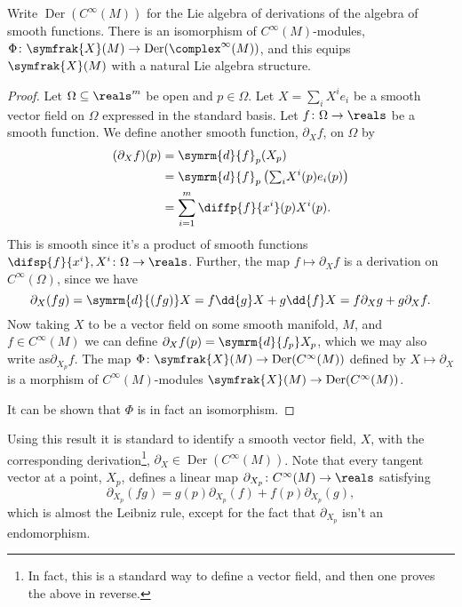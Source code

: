 \documentclass[fleqn]{NotesClass}
\renewcommand{\dl}{\symrm{d}}
\newcommand{\vectorFields}{\symfrak{X}}
\DeclareMathOperator{\Der}{Der}
\newcommand{\derivations}{\Der}
\begin{document}
    \begin{thm}{}{}
        Write \(\derivations(C^{\infty}(M))\) for the Lie algebra of derivations of the algebra of smooth functions. There is an isomorphism of \(C^{\infty}(M)\)-modules, \(\Phi \colon \vectorFields(M) \to \derivations(\complex^{\infty}(M))\), and this equips \(\vectorFields(M)\) with a natural Lie algebra structure.
        \begin{proof}
            Let \(\Omega \subseteq \reals^m\) be open and \(p \in \Omega\).
            Let \(X = \sum_i X^i e_i\) be a smooth vector field on \(\Omega\) expressed in the standard basis.
            Let \(f \colon \Omega \to \reals\) be a smooth function.
            We define another smooth function, \(\partial_Xf\), on \(\Omega\) by
            \begin{align}
                (\partial_X f)(p) &= \dl{f}_p(X_p)\\
                &= \dl{f}_p\left( {\textstyle\sum_i} X^i(p)e_i(p) \right)\\
                &= \sum_{i=1}^m \diffp{f}{x^i}(p) X^i(p).
            \end{align}
            This is smooth since it's a product of smooth functions \(\difsp{f}{x^i}, X^i \colon \Omega \to \reals\).
            Further, the map \(f \mapsto \partial_X f\) is a derivation on \(C^{\infty}(\Omega)\), since we have
            \begin{equation}
                \partial_X(fg) = \dl{(fg)}X = f \dd{g}X + g \dd{f}X = f\partial_Xg + g\partial_Xf.
            \end{equation}
            Now taking \(X\) to be a vector field on some smooth manifold, \(M\), and \(f \in C^{\infty}(M)\) we can define \(\partial_Xf(p) = \dl{f_p}X_p\), which we may also write as\(\partial_{X_p}f\).
            The map \(\Phi \colon \vectorFields(M) \to \derivations(C^{\infty}(M))\) defined by \(X \mapsto \partial_X\) is a morphism of \(C^{\infty}(M)\)-modules \(\vectorFields(M) \to \derivations(C^{\infty}(M))\).
            
            It can be shown that \(\Phi\) is in fact an isomorphism.
        \end{proof}
    \end{thm}
    
    Using this result it is standard to identify a smooth vector field, \(X\), with the corresponding derivation\footnote{In fact, this is a standard way to define a vector field, and then one proves the above in reverse.}, \(\partial_X \in \derivations(C^{\infty}(M))\).
    Note that every tangent vector at a point, \(X_p\), defines a linear map \(\partial_{X_p} \colon C^{\infty}(M) \to \reals\) satisfying
    \begin{equation}
        \partial_{X_p}(fg) = g(p) \partial_{X_p}(f) + f(p) \partial_{X_p}(g),
    \end{equation}
    which is almost the Leibniz rule, except for the fact that \(\partial_{X_p}\) isn't an endomorphism.
    
\end{document}
